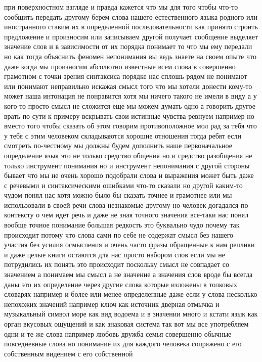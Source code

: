 при поверхностном взгляде и правда кажется что мы для того чтобы что-то сообщить
передать другому берем слова нашего естественного языка родного или иностранного
ставим их в определенной последовательности как принято строить предложение и
произносим или записываем другой получает сообщение выделяет значение слов и в
зависимости от их порядка понимает то что мы ему передали но как тогда объяснить
феномен непонимания вы ведь знаете на своем опыте что даже когда мы произносим
абсолютно известные всем слова в совершенно грамотном с точки зрения синтаксиса
порядке нас сплошь рядом не понимают или понимают неправильно искажая смысл того
что мы хотели донести кому-то может наша интонация не понравится хотя мы ничего
такого не имели в виду а у кого-то просто смысл не сложится еще мы можем думать
одно а говорить другое врать по сути к примеру вскрывать свои истинные чувства
ревнуем например но вместо того чтобы сказать об этом говорим противоположное
мол рад за тебя что у тебя с этим человеком складываются хорошие отношения тогда
ребят если смотреть по-честному мы должны будем дополнить наше первоначальное
определение язык это не только средство общения но и средство разобщения не
только инструмент понимания но и инструмент непонимания с другой стороны бывает
что мы не очень хорошо подобрали слова и выражения может быть даже с речевыми и
синтаксическими ошибками что-то сказали но другой каким-то чудом понял нас хотя
можно было бы сказать точнее и грамотнее или мы использовали в своей речи слова
незнакомые другому но человек догадался по контексту о чем идет речь и даже не
зная точного значения все-таки нас понял вообще точное понимание большая
редкость это буквально чудо почему так происходит потому что слова сами по себе
не содержат смысл без нашего участия без усилия осмысления и очень часто фразы
обращенные к нам реплики и даже целые книги остаются для нас просто набором слов
если мы не потрудились их понять это происходит поскольку смысл не совпадает со
значением а понимаем мы смысл а не значение а значения слов вроде бы всегда даны
это их определение через другие слова которые изложены в толковых словарях
например и более или менее определенные даже если у слова несколько непохожих
значений например ключ как источник дверная отмычка и музыкальный символ море
как вид водоема и в значении много и кстати язык как орган вкусовых ощущений и
как знаковая система так вот мы все употребляем одни и те же слова например
любовь дружба семья совершенно обычные повседневные слова но понимание их для
каждого человека сопряжено с его собственным видением с его собственной
